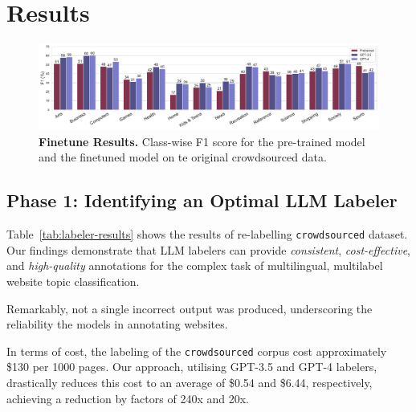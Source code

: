 \section{Results}

\begin{figure}[h]
    \centering
    \includegraphics[width=\textwidth]{./figures/exp2-mf1.pdf}
    \caption{\textbf{Finetune Results.} Class-wise F1 score for the pre-trained model and the finetuned model on te original crowdsourced data.}
    \label{fig:finetune-results}
\end{figure}


\subsection*{Phase 1: Identifying an Optimal LLM Labeler}

Table~\ref{tab:labeler-results} shows the results of re-labelling \texttt{crowdsourced} dataset. Our findings demonstrate that LLM labelers can provide \textit{consistent}, \textit{cost-effective}, and \textit{high-quality} annotations for the complex task of multilingual, multilabel website topic classification. 

Remarkably, not a single incorrect output was produced, underscoring the reliability the models in annotating websites.


In terms of cost, the labeling of the \texttt{crowdsourced} corpus cost approximately \$130 per 1000 pages. Our approach, utilising GPT-3.5 and GPT-4 labelers, drastically reduces this cost to an average of \$0.54 and \$6.44, respectively, achieving a reduction by factors of 240x and 20x.





